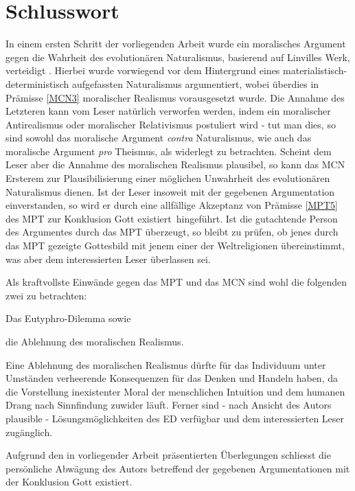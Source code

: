\documentclass[a4paper,11pt]{article}
\numberwithin{equation}{section}
\begin{document}
\section{Schlusswort}
In einem ersten Schritt der vorliegenden Arbeit wurde ein moralisches Argument gegen die Wahrheit des evolutionären Naturalismus, basierend auf Linvilles Werk, verteidigt \cite[S. 391-448]{Linville2009-LINTMA-2}. Hierbei wurde vorwiegend vor dem Hintergrund eines materialistisch-deterministisch aufgefassten Naturalismus argumentiert, wobei überdies in Prämisse \ref{MCN3} moralischer Realismus vorausgesetzt wurde. Die Annahme des Letzteren kann vom Leser natürlich verworfen werden, indem ein moralischer Antirealismus oder moralischer Relativismus postuliert wird - tut man dies, so sind sowohl das moralische Argument \textit{contra} Naturalismus, wie auch das moralische Argument \textit{pro} Theismus, als widerlegt zu betrachten. Scheint dem Leser aber die Annahme des moralischen Realismus plausibel, so kann das MCN Ersterem zur Plausibilisierung einer möglichen Unwahrheit des evolutionären Naturalismus dienen. Ist der Leser insoweit mit der gegebenen Argumentation einverstanden, so wird er durch eine allfällige Akzeptanz von Prämisse \ref{MPT5} des MPT zur Konklusion \flqq Gott existiert\frqq\ hingeführt. Ist die gutachtende Person des Argumentes durch das MPT überzeugt, so bleibt zu prüfen, ob jenes durch das MPT gezeigte Gottesbild mit jenem einer der Weltreligionen übereinstimmt, was aber dem interessierten Leser überlassen sei.

Als kraftvollste Einwände gegen das MPT und das MCN sind wohl die folgenden zwei zu betrachten: \begin{enumerate*} \item Das Eutyphro-Dilemma sowie \item die Ablehnung des moralischen Realismus.
\end{enumerate*} Eine Ablehnung des moralischen Realismus dürfte für das Individuum unter Umständen verheerende Konsequenzen für das Denken und Handeln haben, da die Vorstellung inexistenter Moral der menschlichen Intuition und dem humanen Drang nach Sinnfindung zuwider läuft. Ferner sind - nach Ansicht des Autors plausible - Lösungsmöglichkeiten des ED verfügbar und dem interessierten Leser zugänglich.

Aufgrund den in vorliegender Arbeit präsentierten Überlegungen schliesst die persönliche Abwägung des Autors betreffend der gegebenen Argumentationen mit der Konklusion \flqq Gott existiert\frqq.\
\end{document}
